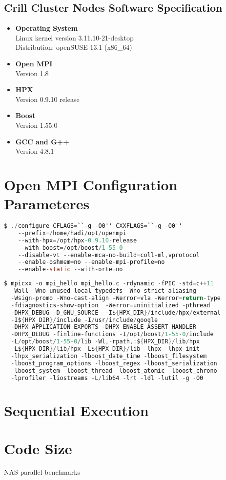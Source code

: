 \subsection{Crill Cluster Nodes Software Specification}
\begin{itemize}
\item \textbf{Operating System}\\
  Linux kernel version 3.11.10-21-desktop\\
  Distribution: openSUSE 13.1 (x86\_64)
\item \textbf{Open MPI}\\
  Version 1.8
\item \textbf{HPX}\\
  Version 0.9.10 release
\item \textbf{Boost}\\
  Version 1.55.0
\item \textbf{GCC and G++}\\
  Version 4.8.1
\end{itemize}

\section{Open MPI Configuration Parameteres}
\begin{lstlisting}[language=C, frame=single, basicstyle=\footnotesize, caption=Configure Line of Open MPI with HPX-RTE\label{lst:config-hpxrte}]
  $ ./configure CFLAGS=``-g -O0'' CXXFLAGS=``-g -O0''
    --prefix=/home/hadi/opt/openmpi
    --with-hpx=/opt/hpx-0.9.10-release
    --with-boost=/opt/boost/1-55-0
    --disable-vt --enable-mca-no-build=coll-ml,vprotocol
    --enable-oshmem=no --enable-mpi-profile=no
    --enable-static --with-orte=no
\end{lstlisting}


\begin{lstlisting}[language=C, frame=single, basicstyle=\footnotesize, caption=Compile line for Hello World\label{lst:compile}]
  $ mpicxx -o mpi_hello mpi_hello.c -rdynamic -fPIC -std=c++11
  -Wall -Wno-unused-local-typedefs -Wno-strict-aliasing
  -Wsign-promo -Wno-cast-align -Werror=vla -Werror=return-type
  -fdiagnostics-show-option  -Werror=uninitialized -pthread
  -DHPX_DEBUG -D_GNU_SOURCE  -I${HPX_DIR}/include/hpx/external
  -I${HPX_DIR}/include -I/usr/include/google
  -DHPX_APPLICATION_EXPORTS -DHPX_ENABLE_ASSERT_HANDLER
  -DHPX_DEBUG -finline-functions -I/opt/boost/1-55-0/include
  -L/opt/boost/1-55-0/lib -Wl,-rpath,:${HPX_DIR}/lib/hpx
  -L${HPX_DIR}/lib/hpx -L${HPX_DIR}/lib -lhpx -lhpx_init
  -lhpx_serialization -lboost_date_time -lboost_filesystem
  -lboost_program_options -lboost_regex -lboost_serialization
  -lboost_system -lboost_thread -lboost_atomic -lboost_chrono
  -lprofiler -liostreams -L/lib64 -lrt -ldl -lutil -g -O0
\end{lstlisting}



\section{Sequential Execution}


\section{Code Size}

NAS parallel benchmarks~\cite{bailey1991parallel}
